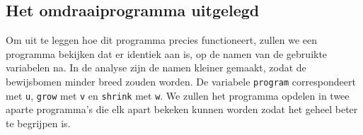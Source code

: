 \subsection{Het omdraaiprogramma uitgelegd}
\label{sec:uitleg programma}

Om uit te leggen hoe dit programma precies functioneert, zullen we een
programma bekijken dat er identiek aan is, op de namen van de gebruikte
variabelen na. In de analyse zijn de namen kleiner gemaakt, zodat de
bewijsbomen minder breed zouden worden. De variabele \texttt{program}
correspondeert met \texttt{u}, \texttt{grow} met \texttt{v} en \texttt{shrink}
met \texttt{w}. We zullen het programma opdelen in twee aparte programma's die
elk apart bekeken kunnen worden zodat het geheel beter te begrijpen is.



